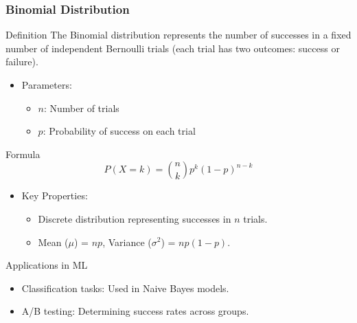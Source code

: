 \documentclass[aspectratio=169]{beamer}
\begin{document}
\begin{frame}[fragile]
    \frametitle{Binomial Distribution}
    \begin{block}{Definition}
        The Binomial distribution represents the number of successes in a fixed number of independent Bernoulli trials (each trial has two outcomes: success or failure).
    \end{block}
    \begin{itemize}
        \item Parameters: 
            \begin{itemize}
                \item $n$: Number of trials
                \item $p$: Probability of success on each trial
            \end{itemize}
    \end{itemize}
    \begin{block}{Formula}
        \begin{equation}
            P(X = k) = \binom{n}{k} p^k (1-p)^{n-k}
        \end{equation}
    \end{block}
    \begin{itemize}
        \item Key Properties:
            \begin{itemize}
                \item Discrete distribution representing successes in $n$ trials.
                \item Mean ($\mu$) = $np$, Variance ($\sigma^2$) = $np(1-p)$.
            \end{itemize}
    \end{itemize}
    \begin{block}{Applications in ML}
        \begin{itemize}
            \item Classification tasks: Used in Naive Bayes models.
            \item A/B testing: Determining success rates across groups.
        \end{itemize}
    \end{block}
\end{frame}
\end{document}

